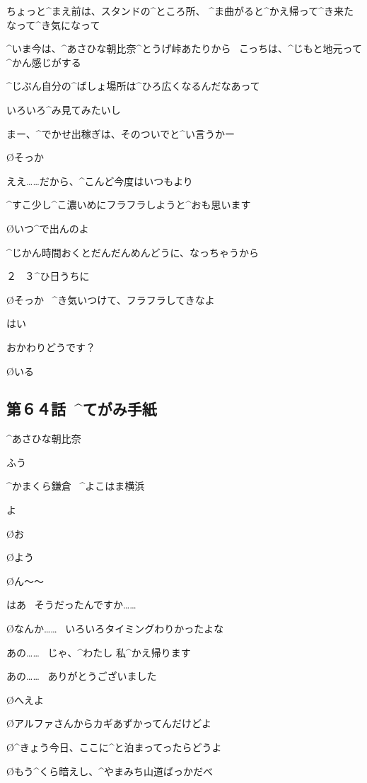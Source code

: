 \A ちょっと^{まえ}{前}は、スタンドの^{ところ}{所}、
^{ま}{曲}がると^{かえ}{帰}って^{き}{来}たなって^{き}{気}になって

\A ^{いま}{今}は、^{あさひな}{朝比奈}^{とうげ}{峠}あたりから
\ こっちは、^{じもと}{地元}って^{かん}{感}じがする

\page
\A ^{じぶん}{自分}の^{ばしょ}{場所}は^{ひろ}{広}くなるんだなあって

\A いろいろ^{み}{見}てみたいし

\A まー、^{でかせ}{出稼}ぎは、そのついでと^{い}{言}うかー

\O そっか

\A ええ……だから、^{こんど}{今度}はいつもより

\A ^{すこ}{少}し^{こ}{濃}いめにフラフラしようと^{おも}{思}います

\page
\O いつ^{で}{出}んのよ

\A ^{じかん}{時間}おくとだんだんめんどうに、なっちゃうから

\A ２
\ ３^{ひ}{日}うちに

\O そっか
\ ^{き}{気}いつけて、フラフラしてきなよ

\A はい

\page
\A おかわりどうです？

\O いる


\subsection{第６４話\ ^{てがみ}{手紙}}

\page[130]
\Sign ^{あさひな}{朝比奈}

\A ふう

\Sign ^{かまくら}{鎌倉}
\ ^{よこはま}{横浜}

\page
\A よ

\page[135]
\O お

\page[137]
\O よう

\O ん〜〜

\page
\K はあ
\ そうだったんですか……

\O なんか……
\ いろいろタイミングわりかったよな

\K あの……
\ じゃ、^{わたし }{私}^{かえ}{帰}ります

\K あの……
\ ありがとうございました

\page
\O へえよ

\O アルファさんからカギあずかってんだけどよ

\O ^{きょう}{今日}、ここに^{と}{泊}まってったらどうよ

\O もう^{くら}{暗}えし、^{やまみち}{山道}ばっかだべ

